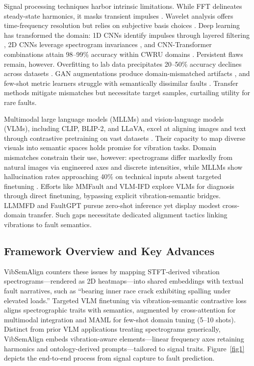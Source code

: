 Signal processing techniques harbor intrinsic limitations. While FFT delineates steady-state harmonics, it masks transient impulses \cite{cite10}. Wavelet analysis offers time-frequency resolution but relies on subjective basis choices \cite{cite11}. Deep learning has transformed the domain: 1D CNNs identify impulses through layered filtering \cite{cite12}, 2D CNNs leverage spectrogram invariances \cite{cite13}, and CNN-Transformer combinations attain 98--99\% accuracy within CWRU domains \cite{cite15}. Persistent flaws remain, however. Overfitting to lab data precipitates 20--50\% accuracy declines across datasets \cite{cite17}. GAN augmentations produce domain-mismatched artifacts \cite{cite18}, and few-shot metric learners struggle with semantically dissimilar faults \cite{cite19}. Transfer methods mitigate mismatches \cite{cite25} but necessitate target samples, curtailing utility for rare faults.

Multimodal large language models (MLLMs) and vision-language models (VLMs), including CLIP, BLIP-2, and LLaVA, excel at aligning images and text through contrastive pretraining on vast datasets \cite{cite20}\cite{cite21}. Their capacity to map diverse visuals into semantic spaces holds promise for vibration tasks. Domain mismatches constrain their use, however: spectrograms differ markedly from natural images via engineered axes and discrete intensities, while MLLMs show hallucination rates approaching 40\% on technical inputs absent targeted finetuning \cite{cite27}\cite{cite28}\cite{cite29}. Efforts like MMFault \cite{cite23} and VLM-IFD \cite{cite24} explore VLMs for diagnosis through direct finetuning, bypassing explicit vibration-semantic bridges. LLMMFD \cite{cite25} and FaultGPT \cite{cite26} pursue zero-shot inference yet display modest cross-domain transfer. Such gaps necessitate dedicated alignment tactics linking vibrations to fault semantics.

\subsection{Framework Overview and Key Advances}

VibSemAlign counters these issues by mapping STFT-derived vibration spectrograms---rendered as 2D heatmaps---into shared embeddings with textual fault narratives, such as ``bearing inner race crack exhibiting spalling under elevated loads.'' Targeted VLM finetuning via vibration-semantic contrastive loss aligns spectrographic traits with semantics, augmented by cross-attention for multimodal integration and MAML for few-shot domain tuning (5--10 shots). Distinct from prior VLM applications treating spectrograms generically, VibSemAlign embeds vibration-aware elements---linear frequency axes retaining harmonics and ontology-derived prompts---tailored to signal traits. Figure~\ref{fig1} depicts the end-to-end process from signal capture to fault prediction.

